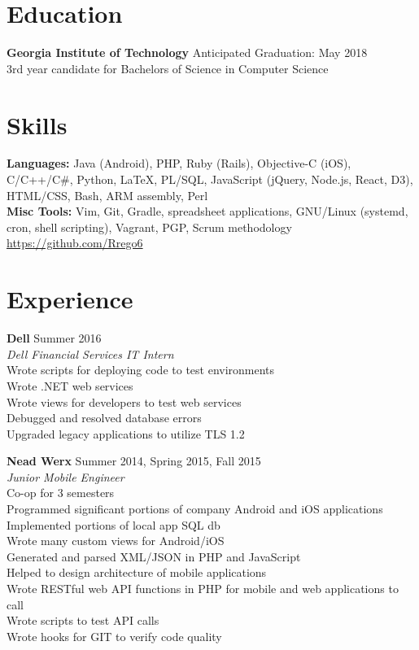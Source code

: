 \documentclass[line, margin]{res}
\begin{document}

\address{402 Roberts Way\\Rincon, GA 31326\\ (912) 346 6060\\ \href{mailto:rrego@gatech.edu}{\textbf{rrego@gatech.edu}}}

\begin{resume}

\section{Education}
\textbf{Georgia Institute of Technology} \hfill Anticipated Graduation: May 2018 \\
3rd year candidate for Bachelors of Science in Computer Science

\section{Skills}
\textbf{Languages:} Java (Android), PHP, Ruby (Rails), Objective-C (iOS), C/C++/C\#, Python, LaTeX, PL/SQL, JavaScript (jQuery, Node.js, React, D3), HTML/CSS, Bash, ARM assembly, Perl \\
\textbf{Misc Tools:} Vim, Git, Gradle, spreadsheet applications, GNU/Linux (systemd, cron, shell scripting), Vagrant, PGP, Scrum methodology\\
\url{https://github.com/Rrego6}

\section{Experience}
\textbf{Dell} \hfill Summer 2016 \\
\textit{Dell Financial Services IT Intern} \\
Wrote scripts for deploying code to test environments \\
Wrote .NET web services \\
Wrote views for developers to test web services \\
Debugged and resolved database errors \\
Upgraded legacy applications to utilize TLS 1.2

\textbf{Nead Werx} \hfill Summer 2014, Spring 2015, Fall 2015 \\
\textit{Junior Mobile Engineer} \\
Co-op for 3 semesters \\
Programmed significant portions of company Android and iOS applications \\
Implemented portions of local app SQL db \\
Wrote many custom views for Android/iOS \\
Generated and parsed XML/JSON in PHP and JavaScript \\
Helped to design architecture of mobile applications\\
Wrote RESTful web API functions in PHP for mobile and web applications to call \\
Wrote scripts to test API calls \\
Wrote hooks for GIT to verify code quality


\end{resume}
\end{document}
